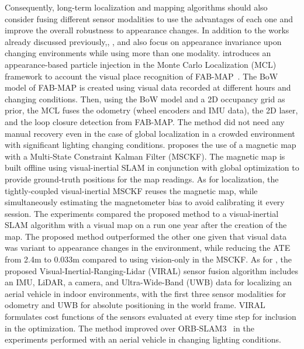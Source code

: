 Consequently, long-term localization and mapping algorithms should also consider fusing different sensor modalities to use the advantages of each one and improve the overall robustness to appearance changes. In addition to the works already discussed previously,\cite{pérez-et-al:2015:y}, \cite{coulin-et-al:2022:3136241}, and \cite{nguyen-et-al:2022:3094157} also focus on appearance invariance upon changing environments while using more than one modality.
\cite{pérez-et-al:2015:y} introduces an appearance-based particle injection in the Monte Carlo Localization (MCL) framework to account the visual place recognition of FAB-MAP~\cite{discussion:fab-map}. The BoW model of FAB-MAP is created using visual data recorded at different hours and changing conditions. Then, using the BoW model and a 2D occupancy grid as prior, the MCL fuses the odometry (wheel encoders and IMU data), the 2D laser, and the loop closure detection from FAB-MAP. The method did not need any manual recovery even in the case of global localization in a crowded environment with significant lighting changing conditions.
\cite{coulin-et-al:2022:3136241} proposes the use of a magnetic map with a Multi-State Constraint Kalman Filter (MSCKF). The magnetic map is built offline using visual-inertial SLAM in conjunction with global optimization to provide ground-truth positions for the map readings. As for localization, the tightly-coupled visual-inertial MSCKF reuses the magnetic map, while simultaneously estimating the magnetometer bias to avoid calibrating it every session. The experiments compared the proposed method to a visual-inertial SLAM algorithm with a visual map on a run one year after the creation of the map. The proposed method outperformed the other one given that visual data was variant to appearance changes in the environment, while reducing the ATE from 2.4m to 0.033m compared to using vision-only in the MSCKF.
As for \cite{nguyen-et-al:2022:3094157}, the proposed Visual-Inertial-Ranging-Lidar (VIRAL) sensor fusion algorithm includes an IMU, LiDAR, a camera, and Ultra-Wide-Band (UWB) data for localizing an aerial vehicle in indoor environments, with the first three sensor modalities for odometry and UWB for absolute positioning in the world frame. VIRAL formulates cost functions of the sensors evaluated at every time step for inclusion in the optimization. The method improved over ORB-SLAM3~\parencite{discussion:orb-slam3} in the experiments performed with an aerial vehicle in changing lighting conditions.



